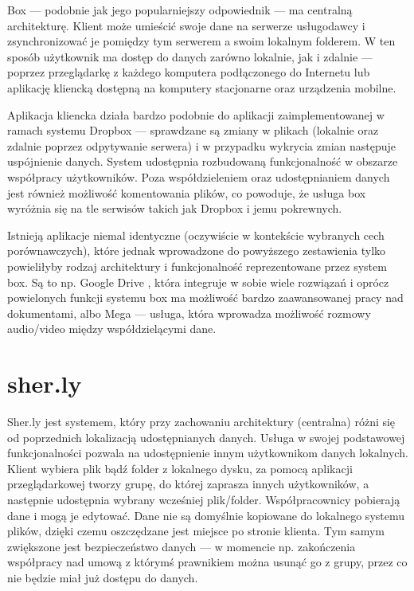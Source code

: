 Box --- podobnie jak jego popularniejszy odpowiednik --- ma centralną architekturę. Klient może umieścić swoje dane na serwerze usługodawcy i zsynchronizować je pomiędzy tym serwerem a swoim lokalnym folderem. W ten sposób użytkownik ma dostęp do danych zarówno lokalnie, jak i zdalnie --- poprzez przeglądarkę z każdego komputera podłączonego do Internetu lub aplikację kliencką dostępną na komputery stacjonarne oraz urządzenia mobilne.

Aplikacja kliencka działa bardzo podobnie do aplikacji zaimplementowanej w ramach systemu Dropbox --- sprawdzane są zmiany w plikach (lokalnie oraz zdalnie poprzez odpytywanie serwera) i w przypadku wykrycia zmian następuje uspójnienie danych. System udostępnia rozbudowaną funkcjonalność w obszarze współpracy użytkowników. Poza współdzieleniem oraz udostępnianiem danych jest również możliwość komentowania plików, co powoduje, że usługa box wyróżnia się na tle serwisów takich jak Dropbox i jemu pokrewnych.

Istnieją aplikacje niemal identyczne (oczywiście w kontekście wybranych cech porównawczych), które jednak wprowadzone do powyższego zestawienia tylko powieliłyby rodzaj architektury i funkcjonalność reprezentowane przez system box. Są to np. Google Drive \cite{googledrive}, która integruje w sobie wiele rozwiązań i oprócz powielonych funkcji systemu box ma możliwość bardzo zaawansowanej pracy nad dokumentami, albo Mega \cite{mega} --- usługa, która wprowadza możliwość rozmowy audio/video między współdzielącymi dane.

\section*{sher.ly}

Sher.ly \cite{sherly} jest systemem, który przy zachowaniu architektury (centralna) różni się od poprzednich lokalizacją udostępnianych danych. Usługa w swojej podstawowej funkcjonalności pozwala na udostępnienie innym użytkownikom danych lokalnych. Klient wybiera plik bądź folder z lokalnego dysku, za pomocą aplikacji przeglądarkowej tworzy grupę, do której zaprasza innych użytkowników, a następnie udostępnia wybrany wcześniej plik/folder. Współpracownicy pobierają dane i mogą je edytować. Dane nie są domyślnie kopiowane do lokalnego systemu plików, dzięki czemu oszczędzane jest miejsce po stronie klienta. Tym samym zwiększone jest bezpieczeństwo danych --- w momencie np. zakończenia współpracy nad umową z którymś prawnikiem można usunąć go z grupy, przez co nie będzie miał już dostępu do danych.

